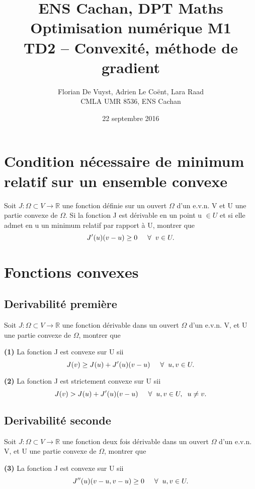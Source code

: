 \documentclass[11pt, a4paper]{article}
\title{ENS Cachan, DPT Maths \\ [1cm]
Optimisation numérique M1 \\ TD2 -- Convexité, méthode de gradient}
\author{Florian De Vuyst, Adrien Le Co\"ent, Lara Raad \\ CMLA UMR 8536, ENS Cachan}
\date{22 septembre 2016}
\newcommand{\mq}{montrer que }
\begin{document}
%
\maketitle
%
\section{Condition nécessaire de minimum relatif sur un ensemble convexe}
%
Soit $J:\Omega \subset V \rightarrow \mathbb{R}$ une fonction définie sur un ouvert $\Omega$ d'un e.v.n. V et U une partie convexe de $\Omega$. Si la fonction J est dérivable en un point u $\in U$ et si elle admet en u un minimum relatif par rapport à U, \mq $$ J'(u)(v-u)\geq 0 \hspace{5mm} \forall \hspace{2mm} v\in U.$$ 

\medskip
\section{Fonctions convexes}
\subsection{Derivabilité première}

Soit $J:\Omega \subset V \rightarrow \mathbb{R}$ une fonction dérivable dans un ouvert $\Omega$ d'un e.v.n. V, et U une partie convexe de $\Omega$, \mq

\textbf{(1)} La fonction J est convexe sur U sii $$ J(v) \geq J(u) + J'(u)(v-u) \hspace{5mm} \forall \hspace{2mm} u,v \in U.$$

\textbf{(2)} La fonction J est strictement convexe sur U sii $$ J(v) >  J(u) + J'(u)(v-u) \hspace{5mm} \forall \hspace{2mm} u,v \in U, \hspace{2mm} u\neq v.$$

\subsection{Derivabilité seconde}

Soit $J:\Omega \subset V \rightarrow \mathbb{R}$ une fonction deux fois dérivable dans un ouvert $\Omega$ d'un e.v.n. V, et U une partie convexe de $\Omega$, \mq

\textbf{(3)} La fonction J est convexe sur U sii $$ J''(u)(v-u,v-u) \geq 0 \hspace{5mm} \forall \hspace{2mm} u,v \in U.$$
\end{document}
